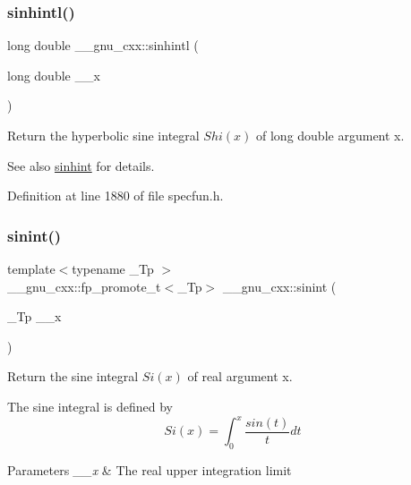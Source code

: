 \subsubsection{\texorpdfstring{sinhintl()}{sinhintl()}}
{\footnotesize\ttfamily long double \+\_\+\+\_\+gnu\+\_\+cxx\+::sinhintl (\begin{DoxyParamCaption}\item[{long double}]{\+\_\+\+\_\+x }\end{DoxyParamCaption})\hspace{0.3cm}{\ttfamily [inline]}}

Return the hyperbolic sine integral $ Shi(x) $ of {\ttfamily long double} argument {\ttfamily x}.

\begin{DoxySeeAlso}{See also}
\hyperlink{group__mathsf__gnu_gab5cbc831c5fab99a967c03d059f1ad59}{sinhint} for details. 
\end{DoxySeeAlso}


Definition at line 1880 of file specfun.\+h.

\mbox{\label{group__mathsf__gnu_ga076c8d52588904f5711c41781f8acfa0}} 
\subsubsection{\texorpdfstring{sinint()}{sinint()}}
{\footnotesize\ttfamily template$<$typename \+\_\+\+Tp $>$ \\
\+\_\+\+\_\+gnu\+\_\+cxx\+::fp\+\_\+promote\+\_\+t$<$\+\_\+\+Tp$>$ \+\_\+\+\_\+gnu\+\_\+cxx\+::sinint (\begin{DoxyParamCaption}\item[{\+\_\+\+Tp}]{\+\_\+\+\_\+x }\end{DoxyParamCaption})\hspace{0.3cm}{\ttfamily [inline]}}

Return the sine integral $ Si(x) $ of real argument {\ttfamily x}.

The sine integral is defined by \[ Si(x) = \int_0^x \frac{sin(t)}{t}dt \]


\begin{DoxyParams}{Parameters}
{\em \+\_\+\+\_\+x} & The real upper integration limit \\
\hline
\end{DoxyParams}


